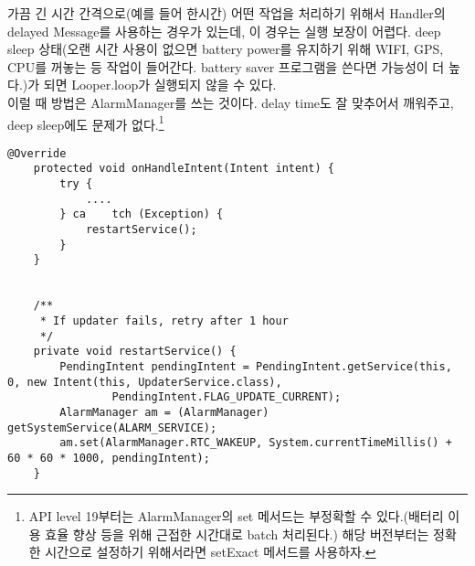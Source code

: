 가끔 긴 시간 간격으로(예를 들어 한시간) 어떤 작업을 처리하기 위해서 Handler의 delayed Message를 사용하는 경우가 있는데,
이 경우는 실행 보장이 어렵다. deep sleep 상태(오랜 시간 사용이 없으면 battery power를 유지하기 위해 WIFI, GPS, CPU를 꺼놓는 등 작업이 들어간다. battery saver 프로그램을 쓴다면 가능성이 더 높다.)가 되면 Looper.loop가 실행되지 않을 수 있다.\\

이럴 때 방법은 AlarmManager를 쓰는 것이다. delay time도 잘 맞추어서 깨워주고, deep sleep에도 문제가 없다.\footnote{API level 19부터는 AlarmManager의 set 메서드는 부정확할 수 있다.(배터리 이용 효율 향상 등을 위해 근접한 시간대로 batch 처리된다.) 해당 버전부터는 정확한 시간으로 설정하기 위해서라면 setExact 메서드를 사용하자.}
\begin{lstlisting}[frame=single]
	@Override
	protected void onHandleIntent(Intent intent) {
		try {
			....
		} ca	tch (Exception) {
			restartService();
		}
	}
 
 
	/**
	 * If updater fails, retry after 1 hour
	 */
	private void restartService() {
		PendingIntent pendingIntent = PendingIntent.getService(this, 0, new Intent(this, UpdaterService.class),  
				PendingIntent.FLAG_UPDATE_CURRENT);
		AlarmManager am = (AlarmManager) getSystemService(ALARM_SERVICE);
		am.set(AlarmManager.RTC_WAKEUP, System.currentTimeMillis() + 60 * 60 * 1000, pendingIntent);
	}
\end{lstlisting}